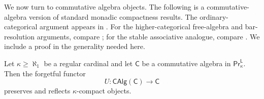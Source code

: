 We now turn to commutative algebra objects. The following is a commutative-algebra version of standard monadic compactness results. The ordinary-categorical argument appears in \cite[Thm.~2.18]{low2016heart}. For the higher-categorical free-algebra and bar-resolution arguments, compare \cite[Lems.~6.15--6.16]{chromaticnullstellensatz}; for the stable associative analogue, compare \cite[Prop.~3.2(2)]{efimovKtheory}. We include a proof in the generality needed here.

\begin{proposition}\label{forgetful functor preserves compacts}
Let $\kappa\geq \aleph_1$ be a regular cardinal and let $\mathsf{C}$ be a commutative algebra in $\mathsf{Pr}^\mathsf{L}_\kappa$. Then the forgetful functor
\[U\colon \mathsf{CAlg}(\mathsf{C})\to \mathsf{C}\]
preserves and reflects $\kappa$-compact objects.
\end{proposition}

